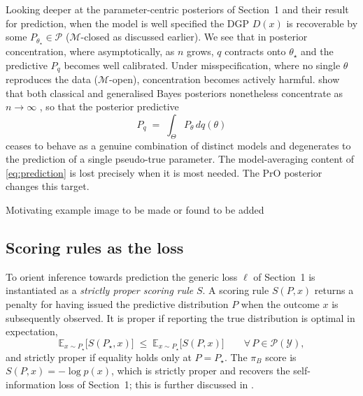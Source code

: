 \documentclass[mstat,12pt]{unswthesis}
\newcommand{\add}[1]{{\color{red}#1}}
\begin{document}
Looking deeper at the parameter-centric posteriors of Section~1 and their result for prediction, when the model is well specified the DGP $D(x)$ is recoverable by some $P_{\theta_\star} \in \mathcal{P}$ ($\mathcal{M}$-closed as discussed earlier). We see that in posterior concentration, where asymptotically, as $n$ grows, $q$ contracts onto $\theta_\star$ and the predictive $P_q$ becomes well calibrated. Under misspecification, where no single $\theta$ reproduces the data ($\mathcal{M}$-open), concentration becomes actively harmful. \citet{mclatchie2025pro} show that both classical and generalised Bayes posteriors nonetheless concentrate as $n \to \infty$ \citep{miller2021}, so that the posterior predictive
$$
    P_q \;=\; \int_\Theta P_\theta \, dq(\theta)
$$
ceases to behave as a genuine combination of distinct models and degenerates to the prediction of a single pseudo-true parameter. The model-averaging content of \eqref{eq:prediction} is lost precisely when it is most needed. The PrO posterior changes this target.


\add{Motivating example image to be made or found to be added}

\subsection*{Scoring rules as the loss}
To orient inference towards prediction the  generic loss $\ell$ of Section~1 is instantiated as a \emph{strictly proper scoring rule} $S$. A scoring rule $S(P, x)$ returns a penalty for having issued the predictive distribution $P$ when the outcome $x$ is subsequently observed. It is proper if reporting the true distribution is optimal in expectation,
$$
    \mathbb{E}_{x \sim P_\star}\!\big[S(P_\star, x)\big] \;\le\; \mathbb{E}_{x \sim P_\star}\!\big[S(P, x)\big] \qquad \forall\, P \in \mathcal{P}(\mathcal{Y}),
$$
and strictly proper if equality holds only at $P = P_\star$. The $\pi_B$ score is $S(P, x) = -\log p(x)$, which is strictly proper and recovers the self-information loss of Section~1; this is further discussed in \cite{GneitingRaftery2007}.
\end{document}
